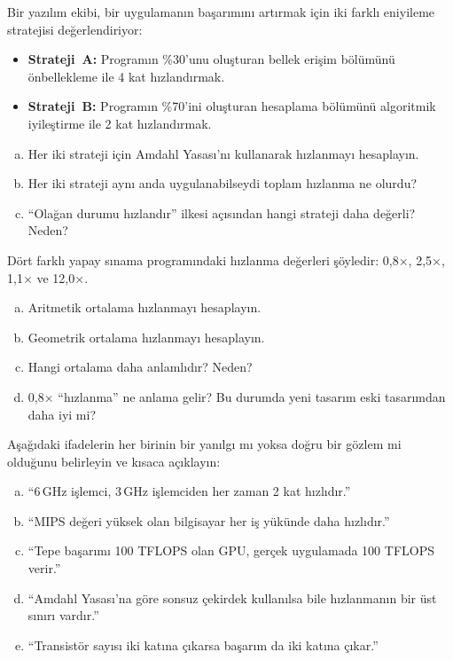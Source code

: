 \begin{alistirma}[\orta]
Bir yazılım ekibi, bir uygulamanın başarımını artırmak için iki farklı eniyileme stratejisi değerlendiriyor:
\begin{itemize}
    \item \textbf{Strateji~A:} Programın \%30'unu oluşturan bellek erişim bölümünü önbellekleme ile 4 kat hızlandırmak.
    \item \textbf{Strateji~B:} Programın \%70'ini oluşturan hesaplama bölümünü algoritmik iyileştirme ile 2 kat hızlandırmak.
\end{itemize}
\begin{enumerate}[(a)]
    \item Her iki strateji için Amdahl Yasası'nı kullanarak hızlanmayı hesaplayın.
    \item Her iki strateji aynı anda uygulanabilseydi toplam hızlanma ne olurdu?
    \item ``Olağan durumu hızlandır'' ilkesi açısından hangi strateji daha değerli? Neden?
\end{enumerate}
\end{alistirma}

\begin{alistirma}[\orta]
Dört farklı yapay sınama programındaki hızlanma değerleri şöyledir: 0,8$\times$, 2,5$\times$, 1,1$\times$ ve 12,0$\times$.
\begin{enumerate}[(a)]
    \item Aritmetik ortalama hızlanmayı hesaplayın.
    \item Geometrik ortalama hızlanmayı hesaplayın.
    \item Hangi ortalama daha anlamlıdır? Neden?
    \item 0,8$\times$ ``hızlanma'' ne anlama gelir? Bu durumda yeni tasarım eski tasarımdan daha iyi mi?
\end{enumerate}
\end{alistirma}

\begin{alistirma}[\orta]
Aşağıdaki ifadelerin her birinin bir yanılgı mı yoksa doğru bir gözlem mi olduğunu belirleyin ve kısaca açıklayın:
\begin{enumerate}[(a)]
    \item ``6\,GHz işlemci, 3\,GHz işlemciden her zaman 2 kat hızlıdır.''
    \item ``MIPS değeri yüksek olan bilgisayar her iş yükünde daha hızlıdır.''
    \item ``Tepe başarımı 100 TFLOPS olan GPU, gerçek uygulamada 100 TFLOPS verir.''
    \item ``Amdahl Yasası'na göre sonsuz çekirdek kullanılsa bile hızlanmanın bir üst sınırı vardır.''
    \item ``Transistör sayısı iki katına çıkarsa başarım da iki katına çıkar.''
\end{enumerate}
\end{alistirma}

